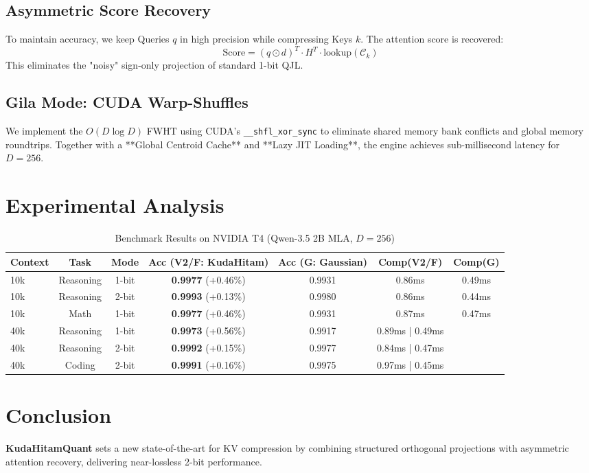\documentclass[twocolumn]{article}
\begin{document}
\subsection{Asymmetric Score Recovery}
To maintain accuracy, we keep Queries $q$ in high precision while compressing Keys $k$. The attention score is recovered:
\begin{equation}
\text{Score} = (q \odot d)^T \cdot H^T \cdot \text{lookup}(\mathcal{C}_k)
\end{equation}
This eliminates the "noisy" sign-only projection of standard 1-bit QJL.

\subsection{Gila Mode: CUDA Warp-Shuffles}
We implement the $O(D \log D)$ FWHT using CUDA's \texttt{\_\_shfl\_xor\_sync} to eliminate shared memory bank conflicts and global memory roundtrips. Together with a **Global Centroid Cache** and **Lazy JIT Loading**, the engine achieves sub-millisecond latency for $D=256$.

\section{Experimental Analysis}
\begin{table}[t]
\centering
\caption{Benchmark Results on NVIDIA T4 (Qwen-3.5 2B MLA, $D=256$)}
\begin{tabular}{@{}lcccccc@{}}
\toprule
Context & Task & Mode & Acc (V2/F: KudaHitam) & Acc (G: Gaussian) & Comp(V2/F) & Comp(G) \\ \midrule
10k & Reasoning & 1-bit & \textbf{0.9977} (+0.46\%) & 0.9931 & 0.86ms & 0.49ms \\
10k & Reasoning & 2-bit & \textbf{0.9993} (+0.13\%) & 0.9980 & 0.86ms & 0.44ms \\
10k & Math & 1-bit & \textbf{0.9977} (+0.46\%) & 0.9931 & 0.87ms & 0.47ms \\ \cmidrule{1-7}
40k & Reasoning & 1-bit & \textbf{0.9973} (+0.56\%) & 0.9917 & 0.89ms | 0.49ms \\
40k & Reasoning & 2-bit & \textbf{0.9992} (+0.15\%) & 0.9977 & 0.84ms | 0.47ms \\
40k & Coding & 2-bit & \textbf{0.9991} (+0.16\%) & 0.9975 & 0.97ms | 0.45ms \\ \bottomrule
\end{tabular}
\end{table}

\section{Conclusion}
\textbf{KudaHitamQuant} sets a new state-of-the-art for KV compression by combining structured orthogonal projections with asymmetric attention recovery, delivering near-lossless 2-bit performance.
\end{document}
